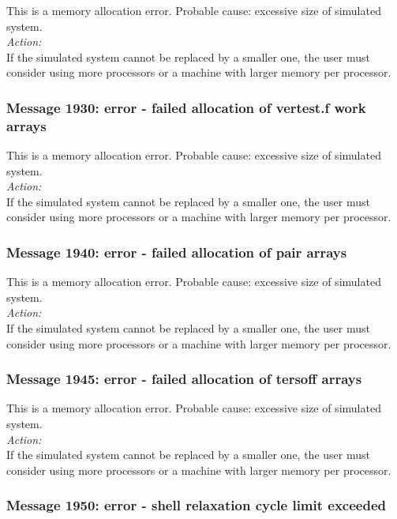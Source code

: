 This is a memory allocation error. Probable cause: excessive size of
simulated system. \\

\noindent
{\em Action:}\\
If the simulated system cannot be replaced by a smaller one, the user
must consider using more processors or a machine with larger memory
per processor.

\subsubsection*{Message 1930: error - failed allocation of vertest.f
work arrays}

This is a memory allocation error. Probable cause: excessive size of
simulated system. \\

\noindent
{\em Action:}\\
If the simulated system cannot be replaced by a smaller one, the user
must consider using more processors or a machine with larger memory
per processor.

\subsubsection*{Message 1940: error - failed allocation of pair arrays}

This is a memory allocation error. Probable cause: excessive size of
simulated system. \\

\noindent
{\em Action:}\\
If the simulated system cannot be replaced by a smaller one, the user
must consider using more processors or a machine with larger memory
per processor.

\subsubsection*{Message 1945: error - failed allocation of tersoff
arrays}

This is a memory allocation error. Probable cause: excessive size of
simulated system. \\

\noindent
{\em Action:}\\
If the simulated system cannot be replaced by a smaller one, the user
must consider using more processors or a machine with larger memory
per processor.

\subsubsection*{Message 1950: error - shell relaxation cycle limit
exceeded}

